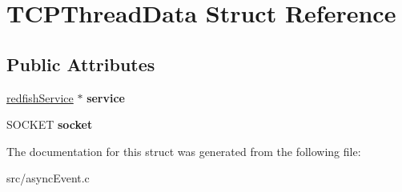 \hypertarget{structTCPThreadData}{}\section{T\+C\+P\+Thread\+Data Struct Reference}
\label{structTCPThreadData}
\subsection*{Public Attributes}
\begin{DoxyCompactItemize}
\item 
\mbox{\label{structTCPThreadData_a1e7efd1a2e7d53f8a0e7b2290b47a4af}} 
\hyperlink{redfishService_8h_a4c9115c0f0a21de971c0dfae06f26372}{redfish\+Service} $\ast$ {\bfseries service}
\item 
\mbox{\label{structTCPThreadData_ac4a34a6ce51baab952d1d1baebf87d00}} 
S\+O\+C\+K\+ET {\bfseries socket}
\end{DoxyCompactItemize}


The documentation for this struct was generated from the following file\+:\begin{DoxyCompactItemize}
\item 
src/async\+Event.\+c\end{DoxyCompactItemize}
